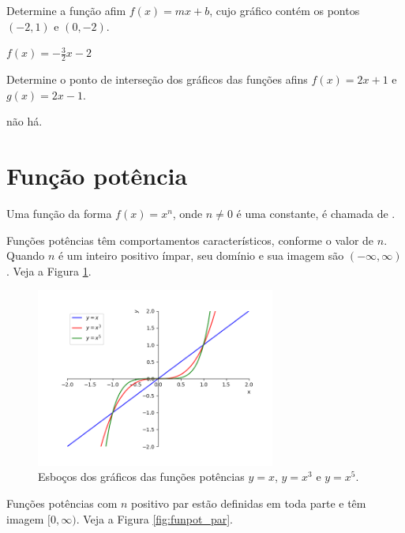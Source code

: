 \begin{ex}
  Determine a função afim $f(x)=mx+b$, cujo gráfico contém os pontos $(-2, 1)$ e $(0, -2)$.
\end{ex}
\begin{resp}
  $f(x) = -\frac{3}{2}x - 2$
\end{resp}

\begin{ex}
  Determine o ponto de interseção dos gráficos das funções afins $f(x) = 2x + 1$ e $g(x) = 2x -1$.
\end{ex}
\begin{resp}
  não há.
\end{resp}

\section{Função potência}\label{cap_funcao_sec_funpot}

Uma função da forma $f(x)=x^n$, onde $n\neq 0$ é uma constante, é chamada de .

Funções potências têm comportamentos característicos, conforme o valor de $n$. Quando $n$ é um inteiro positivo ímpar, seu domínio e sua imagem são $(-\infty, \infty)$. Veja a Figura \ref{fig:funpot_impar}.

\begin{figure}[H]
  \centering
  \includegraphics[width=0.7\textwidth]{./cap_funcao/dados/fig_funpot_impar/fig_funpot_impar}
  \caption{Esboços dos gráficos das funções potências $y=x$, $y=x^3$ e $y=x^5$.}
  \label{fig:funpot_impar}
\end{figure}

Funções potências com $n$ positivo par estão definidas em toda parte e têm imagem $[0, \infty)$. Veja a Figura \ref{fig:funpot_par}.


